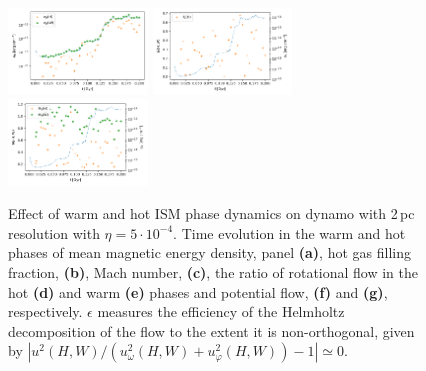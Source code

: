 \documentclass[iop,apj,numberedappendix,twocolappendix]{emulateapj}
\begin{document}
\begin{figure}
\centering
\includegraphics[trim=0.0cm 0.0cm 0.0cm 0.0cm,clip=true,width=0.33\textwidth]{csc_figs/efrac_hot-1e4K_pb2pcPm0e-3_3.png}
\includegraphics[trim=0.0cm 0.0cm 0.0cm 0.0cm,clip=true,width=0.33\textwidth]{csc_figs/efrac_hot-1e4K_fV2pcPm0e-3_3.png}
\includegraphics[trim=0.0cm 0.0cm 0.0cm 0.0cm,clip=true,width=0.33\textwidth]{csc_figs/efrac_hot-1e4K_Ma2pcPm0e-3_3.png}
\caption{
Effect of warm and hot ISM phase dynamics on dynamo with 2\,pc resolution with
$\eta=5\cdot10^{-4}$.
Time evolution in the warm and hot phases of mean magnetic energy density,
panel {\bf{(a)}}, hot gas filling fraction, {\bf{(b)}},
Mach number, {\bf{(c)}}, the ratio of rotational flow in the
hot {\bf{(d)}} and warm {\bf{(e)}} phases and potential flow, {\bf{(f)}} and
{\bf{(g)}}, respectively.
$\epsilon$ measures the efficiency of the Helmholtz decomposition
of the flow to the extent it is non-orthogonal, given by 
$|u^2(H,W)/(u^2_\omega(H,W)+u^2_\varphi(H,W))-1|\simeq0$.
\label{fig:2pc-phases}
}
\end{figure}
\end{document}
